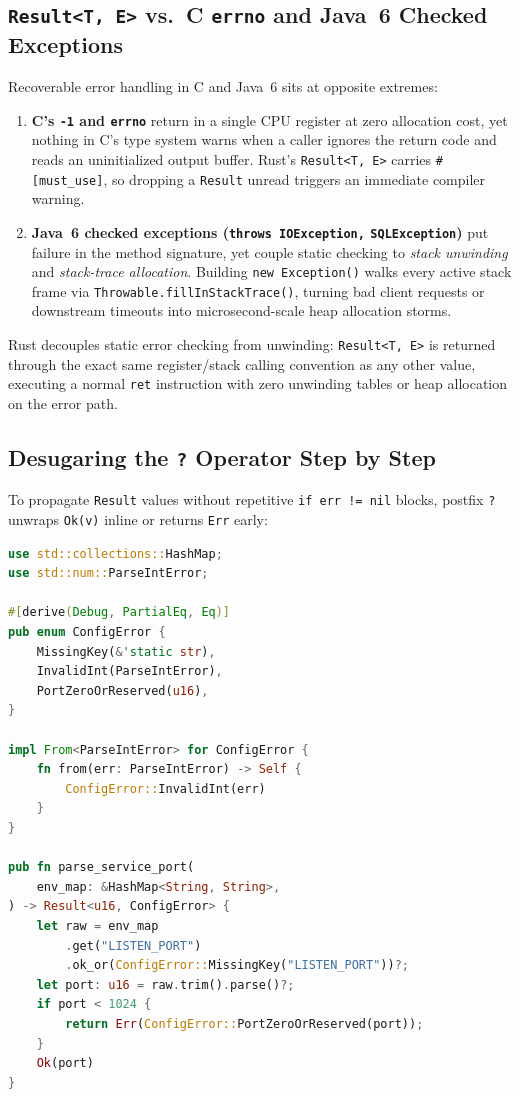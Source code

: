 \subsection{\texttt{Result<T, E>} vs.\ C \texttt{errno} and Java~6 Checked Exceptions}
\label{ch05:result-vs-exceptions}

Recoverable error handling in C and Java~6 sits at opposite extremes:
\begin{enumerate}
  \item \textbf{C's \texttt{-1} and \texttt{errno}} return in a single CPU register at zero allocation cost, yet nothing in C's type system warns when a caller ignores the return code and reads an uninitialized output buffer. Rust's \texttt{Result<T, E>} carries \texttt{\#[must\_use]}, so dropping a \texttt{Result} unread triggers an immediate compiler warning.
  \item \textbf{Java~6 checked exceptions (\texttt{throws IOException,} \allowbreak \texttt{SQLException})} put failure in the method signature, yet couple static checking to \emph{stack unwinding} and \emph{stack-trace allocation}. Building \texttt{new Exception()} walks every active stack frame via \texttt{Throwable.fillInStackTrace()}, turning bad client requests or downstream timeouts into microsecond-scale heap allocation storms.
\end{enumerate}

Rust decouples static error checking from unwinding: \texttt{Result<T, E>} is returned through the exact same register/stack calling convention as any other value, executing a normal \texttt{ret} instruction with zero unwinding tables or heap allocation on the error path.

\subsection{Desugaring the \texttt{?} Operator Step by Step}
\label{ch05:question-mark}

To propagate \texttt{Result} values without repetitive \texttt{if err != nil} blocks, postfix \texttt{?} unwraps \texttt{Ok(v)} inline or returns \texttt{Err} early:

\begin{lstlisting}[language=Rust]
use std::collections::HashMap;
use std::num::ParseIntError;

#[derive(Debug, PartialEq, Eq)]
pub enum ConfigError {
    MissingKey(&'static str),
    InvalidInt(ParseIntError),
    PortZeroOrReserved(u16),
}

impl From<ParseIntError> for ConfigError {
    fn from(err: ParseIntError) -> Self {
        ConfigError::InvalidInt(err)
    }
}

pub fn parse_service_port(
    env_map: &HashMap<String, String>,
) -> Result<u16, ConfigError> {
    let raw = env_map
        .get("LISTEN_PORT")
        .ok_or(ConfigError::MissingKey("LISTEN_PORT"))?;
    let port: u16 = raw.trim().parse()?;
    if port < 1024 {
        return Err(ConfigError::PortZeroOrReserved(port));
    }
    Ok(port)
}
\end{lstlisting}

